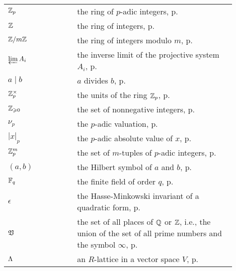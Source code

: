 \begin{longtable}{p{0.25\linewidth} p{0.01\linewidth} p{0.65\linewidth}}
    \(\mathbb{Z}_p\) && the ring of \(p\)-adic integers, p.\,\pageref{chap:local-global-principle}\\
    \(\mathbb{Z}\) && the ring of integers, p.\,\pageref{chap:local-global-principle}\\
    \(\mathbb{Z}/m\mathbb{Z}\) && the ring of integers modulo \(m\), p.\,\pageref{chap:local-global-principle}\\
    \(\varprojlim A_i\) && the inverse limit of the projective system \(A_i\), p.\,\pageref{chap:local-global-principle}\\
    \(a \mid b\) && \(a\) divides \(b\), p.\,\pageref{thm:criterion-units-of-zp}\\
    \(\mathbb{Z}_p^{\times}\) && the units of the ring \(\mathbb{Z}_p\), p.\,\pageref{thm:criterion-units-of-zp}\\
    \(\mathbb{Z}_{\geqslant 0}\) && the set of nonnegative integers, p.\,\pageref{thm:criterion-units-of-zp}\\
    \(\nu_p\) && the \(p\)-adic valuation, p.\,\pageref{thm:criterion-units-of-zp}\\
    \(|x|_p\) && the \(p\)-adic absolute value of \(x\), p.\,\pageref{thm:criterion-units-of-zp}\\
    \(\mathbb{Z}_p^m\) && the set of \(m\)-tuples of \(p\)-adic integers, p.\,\pageref{thm:criterion-units-of-zp}\\
    \((a, b)\) && the Hilbert symbol of \(a\) and \(b\), p.\,\pageref{sec:hilbert-symbol}\\
    \(\mathbb{F}_q\) && the finite field of order \(q\), p.\,\pageref{sec:results-from-witt}\\
    \(\epsilon\) && the Hasse-Minkowski invariant of a quadratic form, p.\,\pageref{sec:hasse-invariant}\\
    \(\mathfrak{V}\) && the set of all places of \(\mathbb{Q}\) or \(\mathbb{Z}\), i.e., the union of the set of all prime numbers and the symbol \(\infty\), p.\,\pageref{sec:hasse-minkowski}\\
    \(\Lambda\) && an \(R\)-lattice in a vector space \(V\), p.\,\pageref{sec:lattice}\\
\end{longtable}